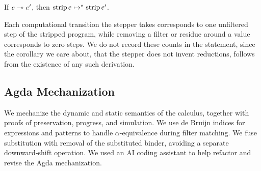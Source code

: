 \begin{theorem}[Simulation]\label{thm:simulation}
  If \(e \twoheadrightarrow e'\), then \(\operatorname{strip}{e} \mapsto^{*} \operatorname{strip}{e'}\).
\end{theorem}

Each computational transition the stepper takes corresponds to one
unfiltered step of the stripped program, while removing a filter or
residue around a value corresponds to zero steps. We do not record
these counts in the statement, since the corollary we care about, that
the stepper does not invent reductions, follows from the existence of
any such derivation.

\subsection{Agda Mechanization}

We mechanize the dynamic and static semantics of the calculus,
together with proofs of preservation, progress, and simulation.
We use de Bruijn indices for
expressions and patterns to handle \(\alpha\)-equivalence during
filter matching. We fuse substitution with removal of the substituted
binder, avoiding a separate downward-shift operation.
We used an AI coding assistant to help refactor and revise the Agda
mechanization.

